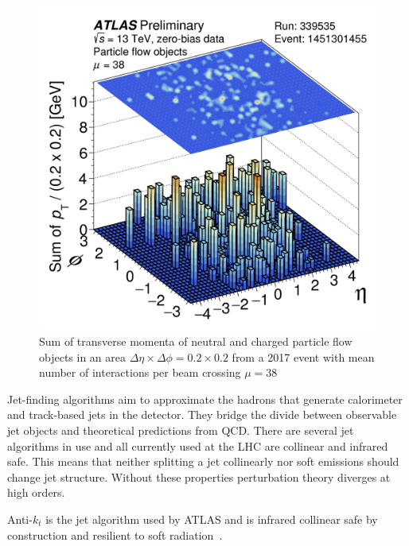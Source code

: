 \begin{figure}[!h]
        \centering
    \includegraphics[width=.4\textwidth]{Pictures/ParticleFlowExample.png}
    \caption{Sum of transverse momenta of neutral and charged particle flow objects in an area $\Delta \eta \times \Delta\phi = 0.2 \times 0.2$ from a 2017 event with mean number of interactions per beam crossing $\mu=38$~\cite{JETEtmiss}}
    \label{fig:ParticleFlowExample}
\end{figure}

Jet-finding algorithms aim to approximate the hadrons that generate calorimeter and track-based jets in the detector. They bridge the divide between observable jet objects and theoretical predictions from QCD. There are several jet algorithms in use and all currently used at the LHC are collinear and infrared safe. This means that neither splitting a jet collinearly nor soft emissions should change jet structure. Without these properties perturbation theory diverges at high orders.

Anti-$k_t$ is the jet algorithm used by ATLAS and is infrared collinear safe by construction and resilient to soft radiation~\cite{antikt}.

